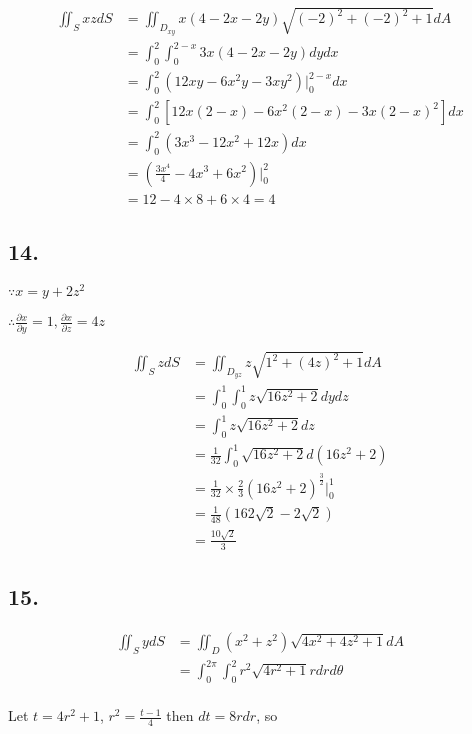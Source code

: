 \documentclass{article}
\begin{document}
  $$\begin{aligned}
    \iint_S xz dS &= \iint_{D_{xy}} x(4-2x-2y) \sqrt{(-2)^2 + (-2)^2 + 1} dA \\
     &= \int_0^2 \int_0^{2-x} 3x(4-2x-2y) dy dx \\
     &= \int_0^2 (12xy - 6x^2y - 3xy^2)\biggl|_0^{2-x} dx \\
     &= \int_0^2 [12x(2-x) - 6x^2(2-x) - 3x(2-x)^2] dx \\
     &= \int_0^2 (3x^3 - 12x^2 + 12x) dx \\
     &= (\frac{3x^4}{4} - 4x^3 + 6x^2)\biggl|_0^2  \\
     &= 12 - 4 \times 8 + 6 \times 4 = 4
  \end{aligned}$$

  \subsection*{14. }

  $\because x = y + 2z^2$

  $\therefore \frac{\partial x}{\partial y} = 1, \frac{\partial x}{\partial z} = 4z$

  $$\begin{aligned}
    \iint_S z dS &= \iint_{D_{yz}} z \sqrt{1^2 + (4z)^2 + 1} dA\\
    &= \int_0^1 \int_0^1 z \sqrt{16z^2 + 2} dy dz \\
    &= \int_0^1 z \sqrt{16z^2 + 2} dz \\
    &= \frac{1}{32} \int_0^1 \sqrt{16z^2+2} d(16z^2 + 2) \\
    &= \frac{1}{32} \times \frac 2 3 (16z^2 + 2)^{\frac 3 2}\biggl|_0^1 \\
    &= \frac{1}{48} (162\sqrt 2 - 2\sqrt 2) \\
    &= \frac{10\sqrt 2}{3}
  \end{aligned}$$

  \subsection*{15. }

  $$\begin{aligned}
    \iint_S y dS &= \iint_D (x^2+z^2) \sqrt{4x^2+4z^2+1} dA \\
    &= \int_0^{2\pi} \int_0^2 r^2 \sqrt{4r^2 + 1} r dr d\theta \\
  \end{aligned}$$

  Let $t = 4r^2 + 1$, $r^2 = \frac{t-1}{4}$ then $dt = 8r dr$, so
\end{document}
